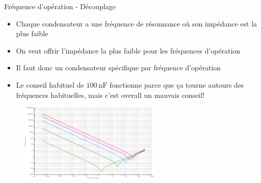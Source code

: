 \begin{frame}{Fréquence d'opération - Découplage}
    \begin{itemize}
        \item Chaque condensateur a une fréquence de résonnance où son impédance est la plus faible
        \item On veut offrir l'impédance la plus faible pour les fréquences d'opération
        \item Il faut donc un condensateur spécifique par fréquence d'opération
        \bigskip
        \item Le conseil habituel de $\SI{100}{\nano\farad}$ fonctionne parce que ça tourne autours des fréquences habituelles, mais c'est overall un mauvais conseil!
    \end{itemize}

    \begin{figure}
        \includegraphics[width=0.6\textwidth, height=0.45\textheight, keepaspectratio]{pictures/decoupling-example-osc.png}
    \end{figure}
\end{frame}

